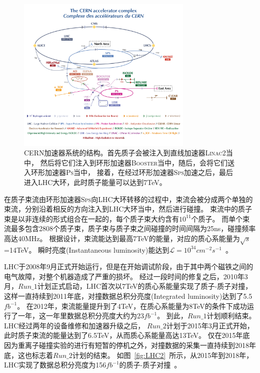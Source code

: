\begin{figure}
  \begin{center}
    \includegraphics[width=0.75\textwidth]{figuresEXP/LHC1.png}
  \end{center}
  \caption{
CERN加速器系统的结构。首先质子会被注入到直线加速器\textsc{Linac2}当中，
然后将它们注入到环形加速器\textsc{Booster}当中，随后，会将它们送入环形加速器\textsc{Ps}当中，
接着，在经过环形加速器\textsc{Sps}加速之后，最后进入LHC大环，此时质子能量可以达到7TeV。
  }
    \label{fig:LHC1}
\end{figure}


在质子束流由环形加速器\textsc{Sps}向LHC大环转移的过程中，束流会被分成两个单独的束流，分别沿着相反的方向注入到LHC大环当中，然后进行碰撞。
束流中的质子束是以非连续的形式组合在一起的，每个质子束大约含有$10^{11}$个质子。
而单个束流最多包含2808个质子束，质子束与质子束之间碰撞的时间间隔为25ns，碰撞频率高达40MHz。
根据设计，束流能达到最高7TeV的能量，对应的质心系能量为$\sqrt{s}$=14TeV。
瞬时亮度(Instantaneous luminosity)能达到$\mathcal{L}=10^34 cm^{-2}s^{-1}$~\cite{Evans:2008zzb}。

LHC于2008年9月正式开始运行，但是在开始调试阶段，由于其中两个磁铁之间的电气故障，对整个机器造成了严重的损坏。
经过一段时间的修复之后，2010年3月，$Run\_1$计划正式启动，LHC首次以7TeV的质心系能量实现了质子-质子对撞，
这样一直持续到2011年底，对撞数据总积分亮度(Integrated luminosity)达到了5.5$fb^{-1}$。
在2012年，束流能量提升到了4TeV，在质心系能量为8TeV的条件下成功运行了一年，这一年里数据总积分亮度大约为23$fb^{-1}$。
到此，$Run\_1$计划顺利结束。
LHC经过两年的设备维修和加速器升级之后，
$Run\_2$计划于2015年3月正式开始，此时质子束流的能量达到了6.5TeV，从而质心系能量高达13TeV。
仅在2015年底因为重离子碰撞实验的进行有短暂的停机之外，对撞数据的采集一直持续到2018年底，这也标志着$Run\_2$计划的结束。
如图~\ref{fig:LHC2}~所示，从2015年到2018年，LHC实现了数据总积分亮度为156$fb^{-1}$的质子-质子对撞~\cite{ATLASWEB1}。

